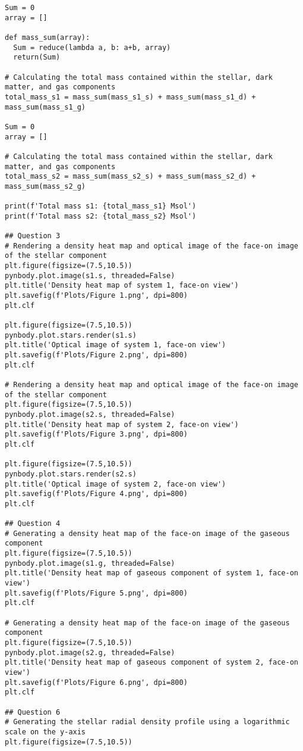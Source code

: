 \documentclass[12pt, a4paper]{article}
\begin{document}
\begin{lstlisting}[language=iPython]
Sum = 0
array = []

def mass_sum(array):
  Sum = reduce(lambda a, b: a+b, array)
  return(Sum)

# Calculating the total mass contained within the stellar, dark matter, and gas components
total_mass_s1 = mass_sum(mass_s1_s) + mass_sum(mass_s1_d) + mass_sum(mass_s1_g)

Sum = 0
array = []

# Calculating the total mass contained within the stellar, dark matter, and gas components
total_mass_s2 = mass_sum(mass_s2_s) + mass_sum(mass_s2_d) + mass_sum(mass_s2_g)

print(f'Total mass s1: {total_mass_s1} Msol')
print(f'Total mass s2: {total_mass_s2} Msol')

## Question 3
# Rendering a density heat map and optical image of the face-on image of the stellar component
plt.figure(figsize=(7.5,10.5))
pynbody.plot.image(s1.s, threaded=False)
plt.title('Density heat map of system 1, face-on view')
plt.savefig(f'Plots/Figure 1.png', dpi=800)
plt.clf

plt.figure(figsize=(7.5,10.5))
pynbody.plot.stars.render(s1.s)
plt.title('Optical image of system 1, face-on view')
plt.savefig(f'Plots/Figure 2.png', dpi=800)
plt.clf

# Rendering a density heat map and optical image of the face-on image of the stellar component
plt.figure(figsize=(7.5,10.5))
pynbody.plot.image(s2.s, threaded=False)
plt.title('Density heat map of system 2, face-on view')
plt.savefig(f'Plots/Figure 3.png', dpi=800)
plt.clf

plt.figure(figsize=(7.5,10.5))
pynbody.plot.stars.render(s2.s)
plt.title('Optical image of system 2, face-on view')
plt.savefig(f'Plots/Figure 4.png', dpi=800)
plt.clf

## Question 4
# Generating a density heat map of the face-on image of the gaseous component
plt.figure(figsize=(7.5,10.5))
pynbody.plot.image(s1.g, threaded=False)
plt.title('Density heat map of gaseous component of system 1, face-on view')
plt.savefig(f'Plots/Figure 5.png', dpi=800)
plt.clf

# Generating a density heat map of the face-on image of the gaseous component
plt.figure(figsize=(7.5,10.5))
pynbody.plot.image(s2.g, threaded=False)
plt.title('Density heat map of gaseous component of system 2, face-on view')
plt.savefig(f'Plots/Figure 6.png', dpi=800)
plt.clf

## Question 6
# Generating the stellar radial density profile using a logarithmic scale on the y-axis
plt.figure(figsize=(7.5,10.5))


\end{lstlisting}
\end{document}

